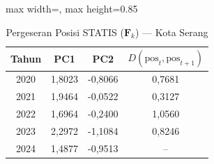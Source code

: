 \begin{table}[H]
\centering
\caption{Pergeseran Posisi STATIS ($\mathbf{F}_k$) --- Kota Serang} \label{tab:app2jarak_statis_skor_kota_serang}
\begin{adjustbox}{max width=\textwidth, max height=0.85\textheight}
\begin{tabular}{|c|c|c|c|}
\hline
\textbf{Tahun} & \textbf{PC1} & \textbf{PC2} & \textbf{$D(\text{pos}_t, \text{pos}_{t+1})$} \\
\hline
2020 & 1,8023 & -0,8066 & 0,7681 \\
2021 & 1,9464 & -0,0522 & 0,3127 \\
2022 & 1,6964 & -0,2400 & 1,0560 \\
2023 & 2,2972 & -1,1084 & 0,8246 \\
2024 & 1,4877 & -0,9513 & -- \\
\hline
\end{tabular}
\end{adjustbox}
\end{table}